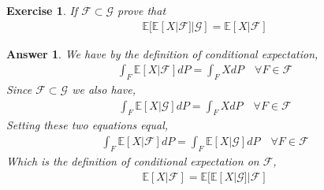 \documentclass[12pt]{article}
\theoremstyle{colon}
\newtheorem{exercise}{Exercise}
\newtheorem*{answer}{Answer}
\begin{document}
\clearpage

\begin{exercise}
  If $\mathcal{F} \subset \mathcal{G}$ prove that
  \begin{gather*}
    \mathbb{E}[\mathbb{E}[X|\mathcal{F}]|\mathcal{G}] = \mathbb{E}[X|\mathcal{F}]
  \end{gather*}
\end{exercise}

\begin{answer}
  We have by the definition of conditional expectation,
  \begin{gather*}
    \int_F \mathbb{E}[X|\mathcal{F}] dP = \int_F X dP \quad \forall F \in \mathcal{F}
  \end{gather*}
  Since $\mathcal{F} \subset \mathcal{G}$ we also have,
  \begin{gather*}
    \int_F \mathbb{E}[X|\mathcal{G}] dP = \int_F X dP \quad \forall F \in \mathcal{F}
  \end{gather*}
  Setting these two equations equal,
  \begin{gather*}
    \int_F \mathbb{E}[X|\mathcal{F}] dP = \int_F \mathbb{E}[X|\mathcal{G}] dP \quad \forall F \in \mathcal{F}
  \end{gather*}
  Which is the definition of conditional expectation on $\mathcal{F}$,
  \begin{gather*}
    \mathbb{E}[X|\mathcal{F}] = \mathbb{E}[\mathbb{E}[X|\mathcal{G}]|\mathcal{F}]
  \end{gather*}
\end{answer}
\end{document}
